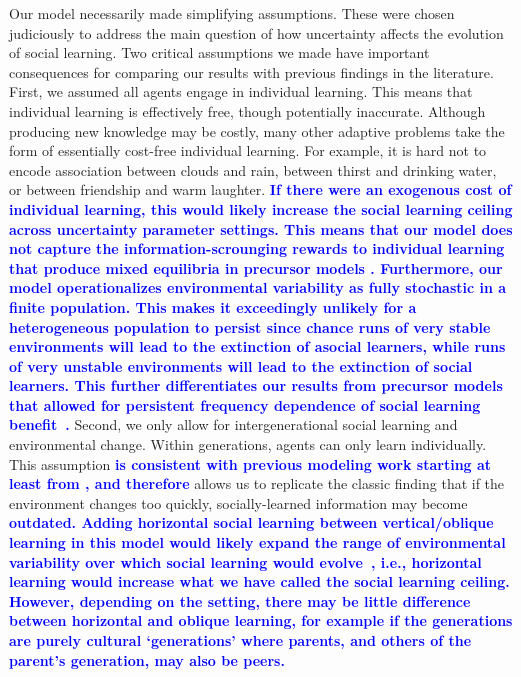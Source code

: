 \documentclass[letterpaper,11.5pt]{scrartcl}
\newcommand{\edit}[1]{{\bfseries \textcolor{blue} {#1}}}
\begin{document}
Our model necessarily made simplifying assumptions. These were chosen judiciously to
address the main question of how uncertainty affects the evolution of social
learning. Two critical assumptions we made have important consequences for comparing
our results with previous findings in the literature. First, we assumed all agents
engage in individual learning. This means that individual learning is effectively
free, though potentially inaccurate. Although producing new knowledge may be costly,
many other adaptive problems take the form of essentially cost-free individual
learning. For example, it is hard not to encode association between clouds and rain,
between thirst and drinking water, or between friendship and warm laughter.
\edit{If there were an exogenous cost of individual learning, this would likely
  increase the social learning ceiling across uncertainty parameter settings.
This means that our model does not capture the information-scrounging rewards to individual learning that produce mixed equilibria in precursor models \cite{Rogers1988}. Furthermore, our model operationalizes environmental variability as fully stochastic in a finite population. This makes it exceedingly unlikely for a heterogeneous population to persist since chance runs of very stable environments will lead to the extinction of asocial learners, while runs of very unstable environments will lead to the extinction of social learners. This further differentiates our results from precursor
models that allowed for persistent frequency
dependence of social learning benefit~\citep{BoydRicherson1985,Rogers1988,Feldman1996}.} Second, we only allow for
intergenerational social learning and environmental change. Within generations,
agents can only learn individually. This assumption \edit{is consistent with previous modeling work starting at least from \cite{Rogers1988}, and therefore} allows us to replicate the classic finding that if the environment changes too quickly, socially-learned information may become \edit{outdated. Adding horizontal social learning between vertical/oblique learning in this model would likely expand the range of environmental variability over which social learning would evolve~\citep{Turner2022}, i.e., horizontal learning would increase what we have called the social learning ceiling. However, depending on the
setting, there may be little difference between horizontal and oblique learning, for
example if the generations are purely cultural ‘generations’ where parents, and
others of the parent's generation, may also be peers.}
\end{document}
